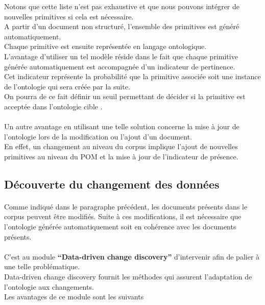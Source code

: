 \documentclass[12pt, a4paper, oneside]{book}
\begin{document}
Notons que cette liste n'est pas exhaustive et que nous pouvons intégrer de nouvelles primitives si cela est nécessaire.\\
A partir d'un document non structuré, l'ensemble des primitives est généré automatiquement.\\
Chaque primitive est ensuite représentée en langage ontologique.\\

L'avantage d'utiliser un tel modèle réside dans le fait que chaque primitive générée automatiquement est accompagnée d'un indicateur de pertinence. \\
Cet indicateur représente la probabilité que la primitive associée soit une instance de l'ontologie qui sera créée par la suite.\\
On pourra de ce fait définir un seuil permettant de décider si la primitive est acceptée dans l'ontologie cible \citep{pomme}.
\paragraph{}
Un autre avantage en utilisant une telle solution concerne la mise à jour de l'ontologie lors de la modification ou l'ajout d'un document.\\En effet, un changement au niveau du corpus implique l'ajout de nouvelles primitives au niveau du POM et la mise à jour de l'indicateur de présence\citep{pom2}.

\subsection{Découverte du changement des données}
\paragraph{}
Comme indiqué dans le paragraphe précédent, les documents présents dans le corpus peuvent être modifiés.
Suite à ces modifications, il est nécessaire que l'ontologie générée automatiquement soit en cohérence avec les documents présents.
\paragraph{}
C'est au module \textbf{“Data-driven change discovery”} d'intervenir afin de palier à une telle problématique.\\
Data-driven change discovery fournit les méthodes qui assurent l'adaptation de l'ontologie aux changements.\\
Les avantages de ce module sont les suivants \citep{discovery} \\
\end{document}
